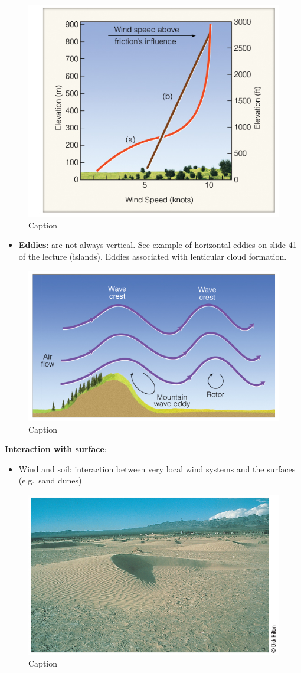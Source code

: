 \documentclass[oneside]{book}
\providecommand{\tightlist}{%
  \setlength{\itemsep}{0pt}\setlength{\parskip}{0pt}}
\begin{document}
\begin{figure}

{\centering \includegraphics[width=0.4\linewidth]{figures/Figure419} 

}

\caption{Caption}\label{fig:Profile}
\end{figure}

\begin{itemize}
\tightlist
\item
  \textbf{Eddies}: are not always vertical. See example of horizontal
  eddies on slide 41 of the lecture (islands). Eddies associated with
  lenticular cloud formation.
\end{itemize}

\begin{figure}

{\centering \includegraphics[width=0.4\linewidth]{figures/Figure420} 

}

\caption{Caption}\label{fig:Eddies}
\end{figure}

\textbf{Interaction with surface}:

\begin{itemize}
\tightlist
\item
  Wind and soil: interaction between very local wind systems and the
  surfaces (e.g.~sand dunes)
\end{itemize}

\begin{figure}

{\centering \includegraphics[width=0.4\linewidth]{figures/Figure421} 

}

\caption{Caption}\label{fig:Soil}
\end{figure}
\end{document}
